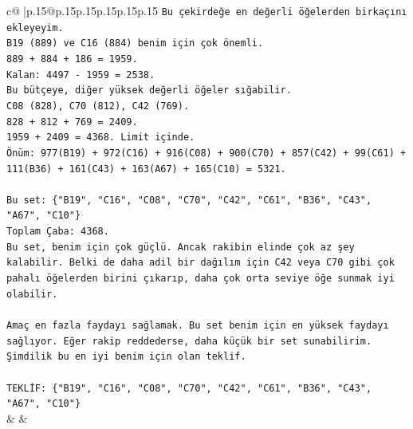 \documentclass{article}
\begin{document}
{\begin{supertabular}{c@{$\;$}|p{.15\linewidth}@{}p{.15\linewidth}p{.15\linewidth}p{.15\linewidth}p{.15\linewidth}p{.15\linewidth}}
{{{\texttt{Bu çekirdeğe en değerli öğelerden birkaçını ekleyeyim.} \\
\texttt{B19 (889) ve C16 (884) benim için çok önemli.} \\
\texttt{889 + 884 + 186 = 1959.} \\
\texttt{Kalan: 4497 {-} 1959 = 2538.} \\
\texttt{Bu bütçeye, diğer yüksek değerli öğeler sığabilir.} \\
\texttt{C08 (828), C70 (812), C42 (769).} \\
\texttt{828 + 812 + 769 = 2409.} \\
\texttt{1959 + 2409 = 4368. Limit içinde.} \\
\texttt{Önüm: 977(B19) + 972(C16) + 916(C08) + 900(C70) + 857(C42) + 99(C61) + 111(B36) + 161(C43) + 163(A67) + 165(C10) = 5321.} \\
\\ 
\texttt{Bu set: \{"B19", "C16", "C08", "C70", "C42", "C61", "B36", "C43", "A67", "C10"\}} \\
\texttt{Toplam Çaba: 4368.} \\
\texttt{Bu set, benim için çok güçlü. Ancak rakibin elinde çok az şey kalabilir. Belki de daha adil bir dağılım için C42 veya C70 gibi çok pahalı öğelerden birini çıkarıp, daha çok orta seviye öğe sunmak iyi olabilir.} \\
\\ 
\texttt{Amaç en fazla faydayı sağlamak. Bu set benim için en yüksek faydayı sağlıyor. Eğer rakip reddederse, daha küçük bir set sunabilirim. Şimdilik bu en iyi benim için olan teklif.} \\
\\ 
\texttt{TEKLİF: \{"B19", "C16", "C08", "C70", "C42", "C61", "B36", "C43", "A67", "C10"\}} \\
            }
        }
    }
    & & \\ \\


\end{supertabular}}
\end{document}
